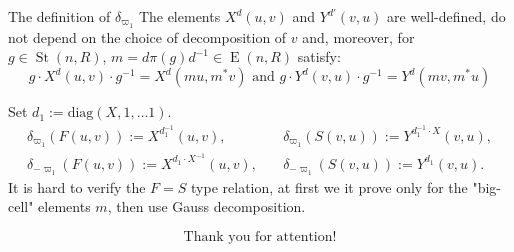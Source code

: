 \documentclass{beamer} %
\DeclareMathOperator{\E}{E}
\DeclareMathOperator{\St}{St}
\theoremstyle{definition}
\begin{document}
\begin{frame}{The definition of $\delta_{\varpi_1}$}
The elements $X^d(u, v)$ and $Y^{d'}(v, u)$ are well-defined, do not depend on the choice of decomposition of $v$ \pause and, moreover, for $g \in \St(n, R)$, $m = d\pi(g)d^{-1} \in \E(n, R)$ satisfy:
\begin{equation*}
g \cdot X^d(u, v) \cdot g^{-1} = X^d(mu, m^*v) \text{ and } g \cdot Y^d(v, u) \cdot g^{-1} = Y^d(mv, m^*u)
\end{equation*}

\pause Set $d_1 := \mathrm{diag}(X, 1, \ldots 1)$.
\begin{align*}
\delta_{\varpi_1} (F(u, v) ) := X^{d_1^{-1}}(u, v), & \quad \delta_{\varpi_1} (S(v, u)) := Y^{d_1^{-1}\cdot X}(v, u), \\
\delta_{-\varpi_1} (F(u, v) ) := X^{d_1 \cdot X^{-1}}(u, v),& \quad \delta_{-\varpi_1} (S(v, u)) := Y^{d_1}(v, u). 
\end{align*}
\pause It is hard to verify the $F=S$ type relation, at first we it prove only for the "big-cell" elements $m$, then use Gauss decomposition.
\end{frame}

\begin{frame}
\[ \text{Thank you for attention!} \]
\end{frame}
\end{document}
